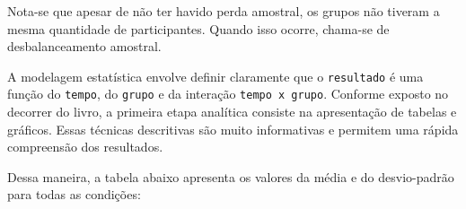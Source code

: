 \documentclass[
]{book}
\newenvironment{Shaded}{\begin{snugshade}}{\end{snugshade}}
\newcommand{\DataTypeTok}[1]{\textcolor[rgb]{0.13,0.29,0.53}{#1}}
\newcommand{\KeywordTok}[1]{\textcolor[rgb]{0.13,0.29,0.53}{\textbf{#1}}}
\newcommand{\NormalTok}[1]{#1}
\newcommand{\OperatorTok}[1]{\textcolor[rgb]{0.81,0.36,0.00}{\textbf{#1}}}
\newcommand{\OtherTok}[1]{\textcolor[rgb]{0.56,0.35,0.01}{#1}}
\newcommand{\StringTok}[1]{\textcolor[rgb]{0.31,0.60,0.02}{#1}}
\begin{document}
Nota-se que apesar de não ter havido perda amostral, os grupos não tiveram a mesma quantidade de participantes. Quando isso ocorre, chama-se de desbalanceamento amostral.

A modelagem estatística envolve definir claramente que o \texttt{resultado} é uma função do \texttt{tempo}, do \texttt{grupo} e da interação \texttt{tempo\ x\ grupo}. Conforme exposto no decorrer do livro, a primeira etapa analítica consiste na apresentação de tabelas e gráficos. Essas técnicas descritivas são muito informativas e permitem uma rápida compreensão dos resultados.

Dessa maneira, a tabela abaixo apresenta os valores da média e do desvio-padrão para todas as condições:

\begin{Shaded}
\end{Shaded}
\end{document}
